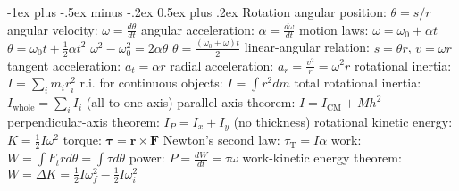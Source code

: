\documentclass[10pt,landscape]{article}
\makeatletter
\renewcommand{\subsection}{\@startsection{subsection}{2}{0mm}%
                                {-1ex plus -.5ex minus -.2ex}%
                                {0.5ex plus .2ex}%
                                {\normalfont\normalsize\bfseries}}
\newcommand{\spc}{\hspace*{1em}}
\makeatother
\begin{document}
\begin{multicols}{3}
\subsection{Rotation}
angular position: $\theta =s/r$
\newline
angular velocity: $\omega =\frac{d\theta}{dt}$
\newline
angular acceleration: $\alpha =\frac{d\omega}{dt}$
\newline
motion laws:
\newline
\spc $\omega =\omega _0+\alpha t$
\newline
\spc $\theta =\omega _0t+\frac{1}{2}\alpha t^2$
\newline
\spc $\omega ^2-\omega _0^2=2\alpha \theta $
\newline
\spc $\theta =\frac{(\omega _0+\omega )t}{2}$
\newline
linear-angular relation: $s=\theta r$, $v=\omega r$
\newline
\spc tangent acceleration: $a_t=\alpha r$
\newline
\spc radial acceleration: $a_r=\frac{v^2}{r}=\omega ^2r$
\newline \newline
rotational inertia: $I=\sum _i m_i r_i^2$
\newline
\spc r.i. for continuous objects: $I=\int r^2dm$
\newline
total rotational inertia: $I_{\mathrm{whole}}=\sum _i I_i$ (all to one axis)
\newline
parallel-axis theorem: $I=I_{\mathrm{CM}}+Mh^2$
\newline
perpendicular-axis theorem: $I_P=I_x+I_y$ (no thickness)
\newline
rotational kinetic energy: $K=\frac{1}{2}I\omega ^2$
\newline
torque: $\boldsymbol{\tau } =\mathbf{r}\times \mathbf{F}$
\newline
Newton's second law: $\tau _\mathrm{T}=I\alpha $
\newline
work: $W=\int F_t rd\theta =\int \tau d\theta $
\newline
power: $P=\frac{dW }{dt}=\tau \omega $
\newline
work-kinetic energy theorem: $W=\Delta K=\frac{1}{2}I\omega _f^2-\frac{1}{2}I\omega _i^2$


\end{multicols}
\end{document}
